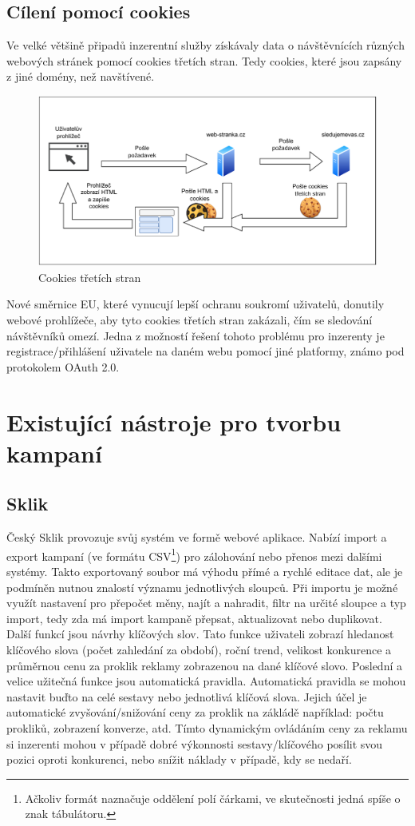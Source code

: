 \subsection{Cílení pomocí cookies}
Ve velké většině připadů inzerentní služby získávaly data o návštěvnících různých webových stránek pomocí cookies třetích stran. Tedy cookies, které
jsou zapsány z jiné domény, než navštívené. 
\begin{figure}[h]
    \includegraphics[width=1.0\textwidth]{Figures/cookies.drawio.pdf}
    \caption{Cookies třetích stran}
    \label{fig:cookies}
\end{figure}
Nové směrnice EU, které vynucují lepší ochranu soukromí uživatelů, donutily webové prohlížeče, aby tyto cookies třetích stran zakázali, čím se sledování
návštěvníků omezí. Jedna z možností řešení tohoto problému pro inzerenty je registrace/přihlášení uživatele na daném webu pomocí jiné platformy, známo pod protokolem
OAuth 2.0.

\section{Existující nástroje pro tvorbu kampaní}

\subsection{Sklik}
Český Sklik provozuje svůj systém ve formě webové aplikace. Nabízí import a export kampaní 
(ve formátu CSV\footnote{Ačkoliv formát naznačuje oddělení polí čárkami, ve skutečnosti jedná spíše o znak tábulátoru.})
pro zálohování nebo přenos mezi dalšími systémy. Takto exportovaný soubor má výhodu přímé a rychlé editace dat, ale je podmíněn nutnou znalostí významu jednotlivých
sloupců. Při importu je možné využít nastavení pro přepočet měny, najít a nahradit, filtr na určité sloupce a typ import, tedy zda má import kampaně přepsat, aktualizovat
nebo duplikovat.
Další funkcí jsou návrhy klíčových slov. Tato funkce uživateli zobrazí hledanost klíčového slova (počet zahledání za období), roční trend, velikost konkurence a průměrnou
cenu za proklik reklamy zobrazenou na dané klíčové slovo. Poslední a velice užitečná funkce jsou automatická pravidla. Automatická pravidla se mohou nastavit buďto na
celé sestavy nebo jednotlivá klíčová slova. Jejich účel je automatické zvyšování/snižování ceny za proklik na zákládě například: počtu prokliků, zobrazení konverze, atd.
Tímto dynamickým ovládáním ceny za reklamu si inzerenti mohou v případě dobré výkonnosti sestavy/klíčového posílit svou pozici oproti konkurenci, nebo snížit náklady
v případě, kdy se nedaří.


